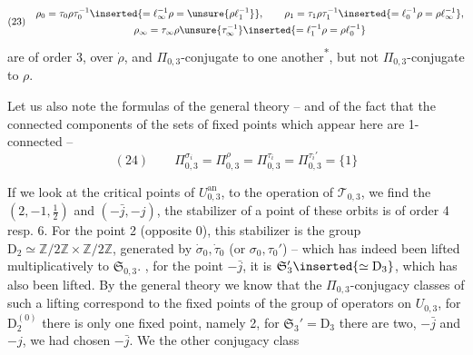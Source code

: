 

\[
(23)\quad
\begin{gathered}
\rho_0=\tau_0\rho\tau_0^{-1}
\inserted{=\ell_\infty^{-1}\rho=\unsure{\rho \ell_1^{-1}}},\qquad
\rho_1=\tau_1\rho\tau_1^{-1}
\inserted{=\ell_0^{-1}\rho=\rho \ell_\infty^{-1}},\\
\rho_\infty=\tau_\infty\rho\unsure{\tau_\infty^{-1}}
\inserted{=\ell_1^{-1}\rho=\rho \ell_0^{-1}}
\end{gathered}
\]
are of order 3, over $\dot\rho$, and $\Pi_{0,3}$-conjugate to one another\textsuperscript{*}, but not $\Pi_{0,3}$-conjugate to $\rho$.


Let us also note  the  formulas of the general theory -- and of the fact that the connected components of the sets of fixed points which appear here are 1-connected --
\[
(24)\qquad
\Pi_{0,3}^{\sigma_i}=\Pi_{0,3}^{\rho}
=\Pi_{0,3}^{\tau_i}=\Pi_{0,3}^{\tau_i'}=\{1\}
\]

If we look at the critical points of $U_{0,3}^{\mathrm{an}}$,  to the operation of $\mathcal{T}_{0,3}$, we find the  $(2,-1,\frac12)$ and $(-\bar j,-j)$, the stabilizer of a point of these orbits is of order 4 resp. 6.
For the point 2 (opposite 0), this stabilizer is the group $\mathrm{D}_2\simeq\mathbb{Z}/2\mathbb{Z}\times\mathbb{Z}/2\mathbb{Z}$, generated by $\dot\sigma_0,\dot\tau_0$ (or $\sigma_0,\tau_0'$) -- which has indeed been lifted multiplicatively to $\mathfrak S_{0,3}$.
, for the point $-\bar j$, it is $\mathfrak S_3'\inserted{\simeq\mathrm{D}_3}$, which has also been lifted.
By the general theory we know that the $\Pi_{0,3}$-conjugacy classes of such a lifting correspond to the fixed points of the group of operators  on $U_{0,3}$, for $\mathrm{D}_2^{(0)}$ there is only one fixed point, namely 2, for $\mathfrak S_3'=\mathrm{D}_3$ there are two, $-\bar j$ and $-j$, we had chosen $-\bar j$.
We  the other conjugacy class


